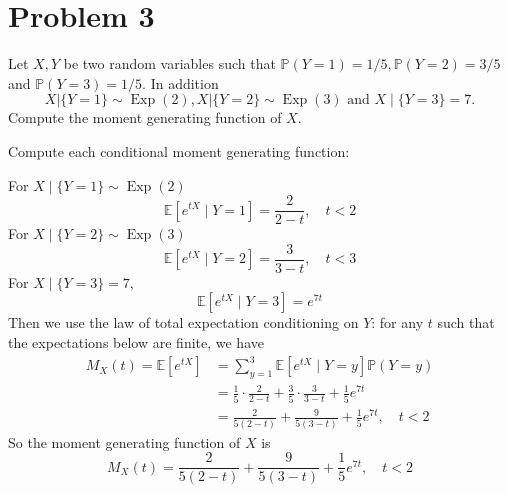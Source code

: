 \section*{Problem 3}
Let $X, Y$ be two random variables such that
 $\mathbb{P}(Y=1)=1 / 5, \mathbb{P}(Y=2)=3 / 5$ 
and $\mathbb{P}(Y=3)= 1 / 5$. In addition
$$
X|\{Y=1\} \sim \operatorname{Exp}(2), X|\{Y=2\} \sim \operatorname{Exp}(3) \text { and } X \mid\{Y=3\}=7 .
$$
Compute the moment generating function of $X$.
\begin{solution}
Compute each conditional moment generating function:

For $X\mid \{Y=1\}\sim \operatorname{Exp}(2)$
\[
\mathbb{E}[e^{tX}\mid Y=1]=\frac{2}{2-t}, \quad t<2
\]
For $X\mid \{Y=2\}\sim \operatorname{Exp}(3)$
\[
\mathbb{E}[e^{tX}\mid Y=2]=\frac{3}{3-t}, \quad t<3
\]
For $X\mid \{Y=3\}=7$, 
\[
\mathbb{E}[e^{tX}\mid Y=3]=e^{7t}
\]
Then we use the law of total expectation conditioning on $Y$: 
for any $t$ such that the expectations below are finite, we have
\begin{align*}
M_X(t)=\mathbb{E}[e^{tX}]
&=\sum_{y=1}^3 \mathbb{E}[e^{tX}\mid Y=y]\mathbb{P}(Y=y)\\
&=\frac{1}{5}\cdot \frac{2}{2-t}
+\frac{3}{5}\cdot \frac{3}{3-t}
+\frac{1}{5}e^{7t}\\
&=\frac{2}{5(2-t)}+\frac{9}{5(3-t)}+\frac{1}{5}e^{7t},
\quad t<2
\end{align*}
So the moment generating function of $X$ is
\[
M_X(t)=\frac{2}{5(2-t)}+\frac{9}{5(3-t)}+\frac{1}{5}e^{7t},
\quad t<2
\]
\end{solution}

